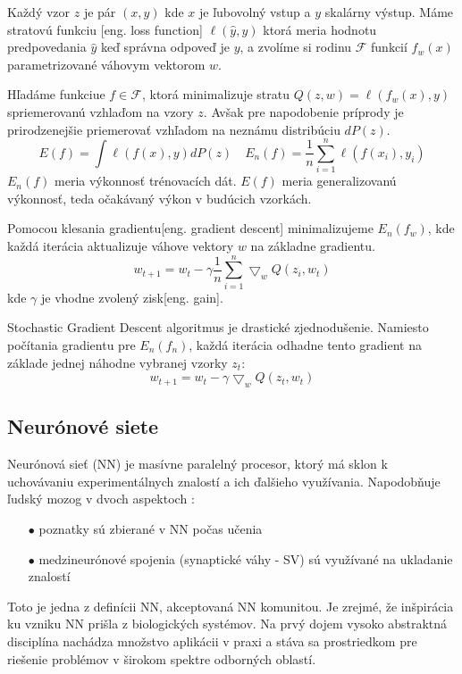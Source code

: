Každý vzor $z$ je pár $(x, y)$ kde $x$ je ľubovolný vstup a $y$ skalárny výstup.
Máme stratovú funkciu [eng. loss function] $\ell(\hat{y},y)$ ktorá meria hodnotu predpovedania $\hat{y}$ keď správna odpoveď je $y$,
    a zvolíme si rodinu $\mathcal{F}$ funkcií $f_w(x)$ parametrizované váhovym vektorom $w$.

Hľadáme funkciue $f \in \mathcal{F}$, ktorá minimalizuje stratu $Q(z,w) = \ell(f_w(x), y)$ spriemerovanú vzhlaďom na vzory $z$.
Avšak pre napodobenie príprody je prirodzenejšie priemerovať vzhľadom na neznámu distribúciu $dP(z)$\cite{prop:StochasticGradientDescent}.
\begin{equation}
    E(f) = \int{\ell(f(x), y)dP(z)} \quad E_n(f) = \frac{1}{n}\sum_{i=1}^{n}\ell(f(x_i), y_i)
\end{equation}
$E_n(f)$ meria výkonnosť trénovacích dát. $E(f)$ meria generalizovanú výkonnosť, teda očakávaný výkon v budúcich vzorkách.

Pomocou klesania gradientu[eng. gradient descent] minimalizujeme $E_n(f_w)$, kde každá iterácia aktualizuje váhove vektory $w$ na základne gradientu.
\begin{equation}
    w_{t+1} = w_t - \gamma \frac{1}{n}\sum_{i=1}^{n}\bigtriangledown_w Q(z_i, w_t)
\end{equation}
kde $\gamma$ je vhodne zvolený zisk[eng. gain].

Stochastic Gradient Descent algoritmus je drastické zjednodušenie.
Namiesto počítania gradientu pre $E_n(f_n)$, každá iterácia odhadne tento gradient na základe jednej náhodne vybranej vzorky $z_t$:
\begin{equation}
    w_{t+1} = w_t - \gamma \bigtriangledown_w Q(z_t, w_t)
\end{equation}


\subsection{Neurónové siete}
Neurónová sieť (NN) je masívne paralelný procesor, ktorý má sklon k uchovávaniu experimentálnych znalostí a ich ďalšieho využívania.
Napodobňuje ľudský mozog v dvoch aspektoch \cite{odkaz:NNIntroduction}:
\begin{enumerate}
	\item[$\bullet$] poznatky sú zbierané v NN počas učenia
	\item[$\bullet$] medzineurónové spojenia (synaptické váhy - SV) sú využívané na ukladanie znalostí
\end{enumerate}
Toto je jedna z definícii NN, akceptovaná NN komunitou.
Je zrejmé, že inšpirácia ku vzniku NN prišla z biologických systémov.
Na prvý dojem vysoko abstraktná disciplína nachádza množstvo aplikácii v praxi a stáva sa prostriedkom pre riešenie problémov v širokom spektre odborných oblastí\cite{odkaz:NNIntroduction}.

